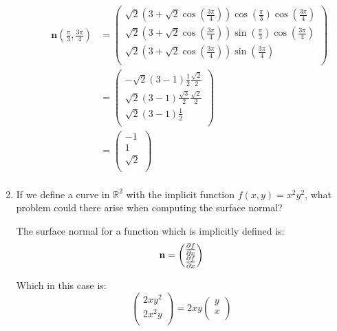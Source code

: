 \documentclass[10pt,\jkfside,a4paper]{article}
\begin{document}
\begin{enumerate}
\begin{enumerate}
\[
\begin{split}
\mathbf{n}\left( \frac{\pi}{3}, \frac{3\pi}{4} \right)
&=
\begin{pmatrix}
\sqrt{2}\left( 3 + \sqrt{2}\cos\left( \frac{3\pi}{4} \right) \right)
\cos\left( \frac{\pi}{3} \right)
\cos\left( \frac{3\pi}{4} \right)\\
\sqrt{2}\left( 3 + \sqrt{2}\cos\left( \frac{3\pi}{4} \right) \right)\sin\left(
\frac{\pi}{3} \right)\cos\left( \frac{3\pi}{4} \right) \\
\sqrt{2}\left( 3 + \sqrt{2}\cos\left( \frac{3\pi}{4} \right) \right)\sin\left( \frac{3\pi}{4} \right) \\
\end{pmatrix}\\
&=
\begin{pmatrix}
-\sqrt{2}\left( 3 - 1 \right)
\frac{1}{2}\frac{\sqrt {2}}{2}\\
\sqrt{2}\left( 3 - 1 \right)\frac{\sqrt{3}}{2}\frac{\sqrt {2}}{2} \\
\sqrt{2}\left( 3 - 1 \right)\frac{1}{2} \\
\end{pmatrix}\\
&=
\begin{pmatrix}
-1\\
1 \\
\sqrt{2} \\
\end{pmatrix}\\
\end{split}
\]


\end{enumerate}

\setcounter{enumi}{4}

\item If we define a curve in $\mathbb{R}^2$ with the implicit function $f
(x, y) = x^2 y^2$, what problem could there arise when computing the
surface normal?

The surface normal for a function which is implicitly defined is:
\[
\mathbf{n} = \begin{pmatrix}
\pdv{f}{x} \\
\pdv{f}{x} \\
\end{pmatrix}
\]

Which in this case is:
\[
\begin{pmatrix}
2x y^2 \\
2x^2 y \\
\end{pmatrix}
=
2xy\begin{pmatrix}
y\\
x\\
\end{pmatrix}
\]


\end{enumerate}
\end{document}
